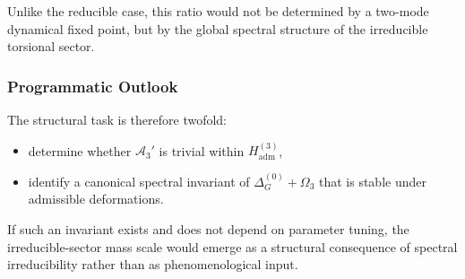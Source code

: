     Unlike the reducible case,
    this ratio would not be determined by a two-mode dynamical fixed point,
    but by the global spectral structure of the irreducible torsional
    sector.

  \subsubsection*{Programmatic Outlook}

    The structural task is therefore twofold:

    \begin{itemize}
      \item[(i)] determine whether $\mathcal{A}_3'$ is trivial within
      $H_{\mathrm{adm}}^{(3)}$,
      \item[(ii)] identify a canonical spectral invariant of
      $\Delta^{(0)}_G+\Omega_3$ that is stable under admissible
      deformations.
    \end{itemize}

    If such an invariant exists and does not depend on parameter tuning,
    the irreducible-sector mass scale would emerge as a structural
    consequence of spectral irreducibility rather than as
    phenomenological input.
